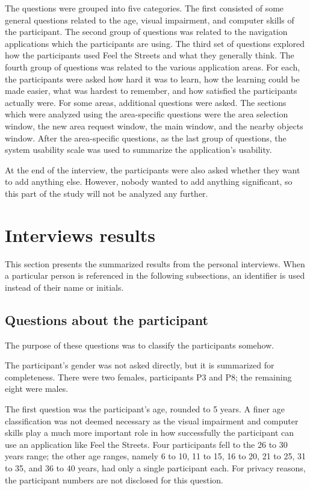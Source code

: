 \documentclass[nolof,digital]{fithesis3}
\begin{document}
The questions were grouped into five categories. The first consisted of some general questions related to the age, visual impairment, and computer skills of the participant. The second group of questions was related to the navigation applications which the participants are using. The third set of questions explored how the participants used Feel the Streets and what they generally think. The fourth group of questions was related to the various application areas. For each, the participants were asked how hard it was to learn, how the learning could be made easier, what was hardest to remember, and how satisfied the participants actually were. For some areas, additional questions were asked. The sections which were analyzed using the area-specific questions were the area selection window, the new area request window, the main window, and the nearby objects window. After the area-specific questions, as the last group of questions, the system usability scale \parencite{brooke1996} was used to summarize the application's usability.

At the end of the interview, the participants were also asked whether they want to add anything else. However, nobody wanted to add anything significant, so this part of the study will not be analyzed any further.
\section{Interviews results}
This section presents the summarized results from the personal interviews. When a particular person is referenced in the following subsections, an identifier is used instead of their name or initials.
\subsection{Questions about the participant}
The purpose of these questions was to classify the participants somehow.

The participant's gender was not asked directly, but it is summarized for completeness. There were two females, participants P3 and P8; the remaining eight were males.

The first question was the participant's age, rounded to 5 years. A finer age classification was not deemed necessary as the visual impairment and computer skills play a much more important role in how successfully the participant can use an application like Feel the Streets. Four participants fell to the 26 to 30 years range; the other age ranges, namely 6 to 10, 11 to 15, 16 to 20, 21 to 25, 31 to 35, and 36 to 40 years, had only a single participant each. For privacy reasons, the participant numbers are not disclosed for this question.
\end{document}
